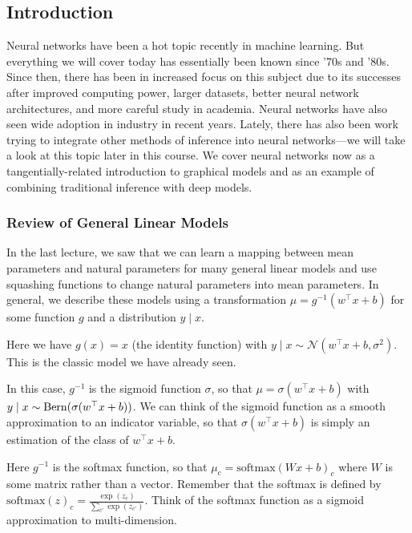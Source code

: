\documentclass{article}
\begin{document}

\subsection{Introduction}
Neural networks have been a hot topic recently in machine learning. But everything we will cover today has essentially been known since '70s and '80s. Since then, there has been in increased focus on this subject due to its successes after improved computing power, larger datasets, better neural network architectures, and more careful study in academia. Neural networks have also seen wide adoption in industry in recent years. Lately, there has also been work trying to integrate other methods of inference into neural networks---we will take a look at this topic later in this course.  We cover neural networks now as a tangentially-related introduction to graphical models and as an example of combining traditional inference with deep models.

\subsubsection{Review of General Linear Models}

In the last lecture, we saw that we can learn a mapping between mean parameters and natural parameters for many general linear models and use squashing functions to change natural parameters into mean parameters.  In general, we describe these models using a transformation $\mu = g^{-1}(w^\top x+b)$ for some function $g$ and a distribution $y \mid x$.

\begin{example}
    Here we have $g(x) = x$ (the identity function) with $y \mid x \sim \mathcal{N}(w^\top x+b, \sigma^2)$.  This is the classic model we have already seen.
\end{example}

\begin{example}
    In this case, $g^{-1}$ is the sigmoid function $\sigma$, so that $\mu = \sigma(w^\top x+b)$ with $y \mid x \sim\operatorname{Bern}(\sigma(w^\top x+b))$.  We can think of the sigmoid function as a smooth approximation to an indicator variable, so that $\sigma(w^\top x+b)$ is simply an estimation of the class of $w^\top x+b$.
\end{example}

\begin{example}
    Here $g^{-1}$ is the softmax function, so that $\mu_c = \text{softmax}(Wx+b)_c$ where $W$ is some matrix rather than a vector.  Remember that the softmax is defined by $\text{softmax}(z)_c = \frac{\exp(z_c)}{\sum_{c'} \exp(z_{c'})}$.  Think of the softmax function as a sigmoid approximation to multi-dimension.
\end{example}
\end{document}

